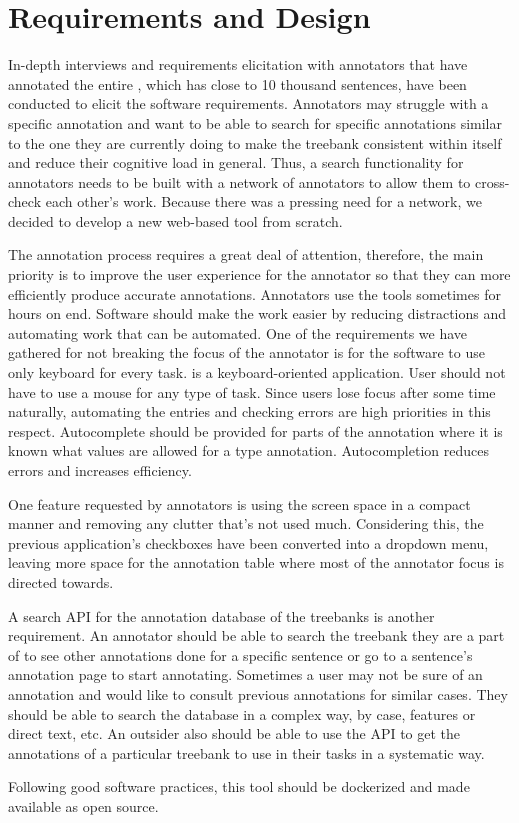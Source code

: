 \section{Requirements and Design}
\label{sec:requirements}

In-depth interviews and requirements elicitation with annotators that have annotated the entire \bountreebank{}, which has close to 10 thousand sentences, have been conducted to elicit the software requirements.
Annotators may struggle with a specific annotation and want to be able to search for specific annotations similar to the one they are currently doing to make the treebank consistent within itself and reduce their cognitive load in general.
Thus, a search functionality for annotators needs to be built with a network of annotators to allow them to cross-check each other's work.
Because there was a pressing need for a network, we decided to develop a new web-based tool from scratch.

The annotation process requires a great deal of attention, therefore, the main priority is to improve the user experience for the annotator so that they can more efficiently produce accurate annotations.
Annotators use the tools sometimes for hours on end.
Software should make the work easier by reducing distractions and automating work that can be automated.
One of the requirements we have gathered for not breaking the focus of the annotator is for the software to use only keyboard for every task.
\boat{} is a keyboard-oriented application.
User should not have to use a mouse for any type of task.
Since users lose focus after some time naturally, automating the entries and checking errors are high priorities in this respect.
Autocomplete should be provided for parts of the annotation where it is known what values are allowed for a \conllu{} type annotation.
Autocompletion reduces errors and increases efficiency.

One feature requested by annotators is using the screen space in a compact manner and removing any clutter that's not used much.
Considering this, the previous application's checkboxes have been converted into a dropdown menu, leaving more space for the annotation table where most of the annotator focus is directed towards.

A search API for the annotation database of the treebanks is another requirement.
An annotator should be able to search the treebank they are a part of to see other annotations done for a specific sentence or go to a sentence's annotation page to start annotating.
Sometimes a user may not be sure of an annotation and would like to consult previous annotations for similar cases.
They should be able to search the database in a complex way, by case, features or direct text, etc.
An outsider also should be able to use the API to get the annotations of a particular treebank to use in their tasks in a systematic way.

Following good software practices, this tool should be dockerized and made available as open source.
